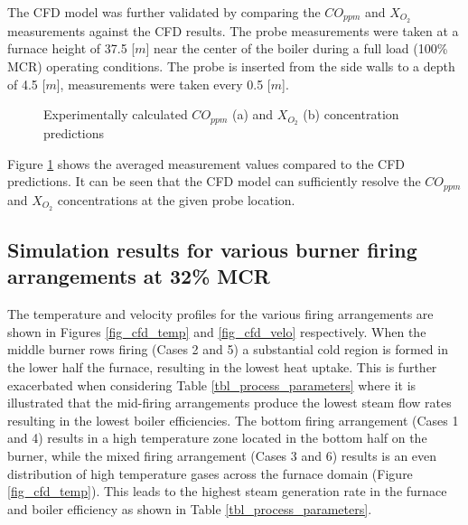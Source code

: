 \documentclass[review]{elsarticle}
\begin{document}
The CFD model was further validated by comparing the $CO_{ppm}$ and $X_{O_{2}}$ measurements against the CFD results. The probe measurements were taken at a furnace height of 37.5 [$m$] near the center of the boiler during a full load (100\% MCR) operating conditions. The probe is inserted from the side walls to a depth of 4.5 [$m$], measurements were taken every 0.5 [$m$].\\
\begin{figure}[h!]
\centering
{}
\hspace{5mm}
\caption{Experimentally calculated $CO_{ppm}$ (a) and $X_{O_{2}}$ (b) concentration predictions}
\label{fig_probe_valid}
\end{figure}

Figure \ref{fig_probe_valid} shows the averaged measurement values compared to the CFD predictions. It can be seen that the CFD model can sufficiently resolve the $CO_{ppm}$ and $X_{O_{2}}$ concentrations at the given probe location.
\newpage
\subsection{Simulation results for various burner firing arrangements at 32\% MCR }
The temperature and velocity profiles for the various firing arrangements are shown in Figures \ref{fig_cfd_temp} and \ref{fig_cfd_velo} respectively. When the middle burner rows firing (Cases 2 and 5) a substantial cold region is formed in the lower half the furnace, resulting in the lowest heat uptake. This is further exacerbated when considering Table \ref{tbl_process_parameters} where it is illustrated that the mid-firing arrangements produce the lowest steam flow rates resulting in the lowest boiler efficiencies. The bottom firing arrangement (Cases 1 and 4) results in a high temperature zone located in the bottom half on the burner, while the mixed firing arrangement (Cases 3 and 6) results is an even distribution of high temperature gases across the furnace domain (Figure \ref{fig_cfd_temp}). This leads to the highest steam generation rate in the furnace and boiler efficiency as shown in Table \ref{tbl_process_parameters}.
\end{document}
